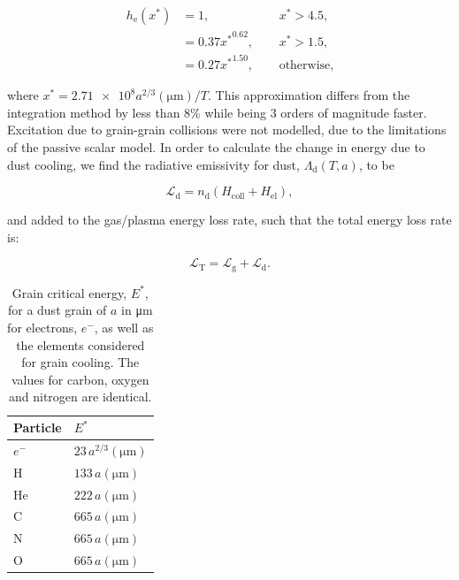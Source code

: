 \documentclass[fleqn,usenatbib]{mnras}
\newcommand{\rms}[1]{\ensuremath{_{\text{#1}}}}
\begin{document}
\begin{equation}
  \begin{alignedat}{3}
    h\rms{e}(x^*) & = 1 ,                && ~~ x^* > 4.5, \\
             & = 0.37{x^*}^{0.62} , && ~~ x^* > 1.5 , \\
             & = 0.27{x^*}^{1.50} , && ~~ \text{otherwise,}
  \end{alignedat}
\end{equation}

\noindent
where $x^* = \num{2.71e8} a^{2/3} (\si{\micro\metre})/T$.
This approximation differs from the integration method by less than 8\% while being 3 orders of magnitude faster.
Excitation due to grain-grain collisions were not modelled, due to the limitations of the passive scalar model.
In order to calculate the change in energy due to dust cooling, we find the radiative emissivity for dust, $\Lambda\rms{d}(T,a)$, to be

\begin{equation}
  \mathcal{L}\rms{d} = n_\text{d} (H\rms{coll} + H\rms{el}) ,
\end{equation}

\noindent
and added to the gas/plasma energy loss rate, such that the total energy loss rate is:

\begin{equation}
  \mathcal{L}\rms{T} = \mathcal{L}\rms{g} + \mathcal{L}\rms{d} .
\end{equation}

\begin{table}
  \centering
  \begin{tabular}{ll}
    \hline
    Particle & $E^*$ \\
    \hline
    $e^-$ & $23 \, a^{2/3}(\si{\micro\metre})$ \\
    H     & $133 \, a(\si{\micro\metre})$ \\
    He    & $222 \, a(\si{\micro\metre})$ \\
    C     & $665 \, a(\si{\micro\metre})$ \\
    N     & $665 \, a(\si{\micro\metre})$ \\
    O     & $665 \, a(\si{\micro\metre})$ \\
    \hline
  \end{tabular}
  \caption[Grain critical energy]{Grain critical energy, $E^*$, for a dust grain of $a$ in \si{\micro\metre} for electrons, $e^-$, as well as the elements considered for grain cooling. The values for carbon, oxygen and nitrogen are identical.}
  \label{tab:p2-criticalenergy}
\end{table}
\end{document}
